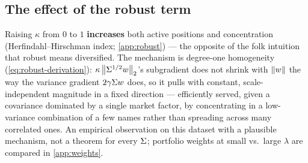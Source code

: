 \subsection{The effect of the robust term}

Raising $\kappa$ from $0$ to $1$ \textbf{increases} both active positions and concentration
(Herfindahl--Hirschman index; \cref{app:robust}) --- the opposite of the folk intuition that
robust means diversified. The mechanism is degree-one homogeneity (\cref{eq:robust-derivation}):
$\kappa\left\lVert \Sigma^{1/2} w \right\rVert_2$'s subgradient does not shrink with $\left\lVert w \right\rVert$ the way the variance
gradient $2\gamma\Sigma w$ does, so it pulls with constant, scale-independent magnitude in a fixed
direction --- efficiently served, given a covariance dominated by a single market factor, by
concentrating in a low-variance combination of a few names rather than spreading across many
correlated ones. An empirical observation on this dataset with a plausible mechanism, not a
theorem for every $\Sigma$; portfolio weights at small vs.\ large $\lambda$ are compared in
\cref{app:weights}.
